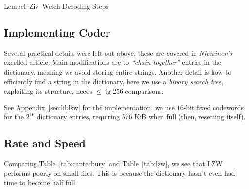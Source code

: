 \documentclass[a4paper, twocolumn]{article}
\begin{document}
        \begin{algorithm}
            \begin{algorithmic}
                    \ELSE
                    \ENDIF
                \ENDWHILE
            \end{algorithmic}
            \caption{Lempel--Ziv--Welch Decoding Steps}
            \label{alg:lzwx}
        \end{algorithm}
        \vspace{-0.2in}
        \subsection{Implementing Coder} \label{sec:lzw_implementing_coder}

        Several practical details were left out above, these are covered in \emph{Nieminen's}~\cite{nieminen2007efficient} excelled article. Main modifications are to \emph{``chain together''} entries in the dictionary, meaning we avoid storing entire strings. Another detail is how to efficiently find a string in the dictionary, here we use a \emph{binary search tree}, exploiting its structure, needs \(\leq\lg 256\) comparisons.

        See Appendix~\ref{sec:liblzw} for the implementation, we use \(16\)-bit fixed codewords for the \(2^{16}\) dictionary entries, requiring 576 KiB when full (then, resetting itself).

        \subsection{Rate and Speed} \label{sec:lzw_rate_and_speed}

        Comparing Table~\ref{tab:canterbury} and Table~\ref{tab:lzw}, we see that LZW performs poorly on small files. This is because the dictionary hasn't even had time to become half full.
\end{document}
